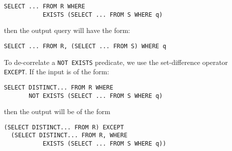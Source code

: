 {\footnotesize
\begin{verbatim}
SELECT ... FROM R WHERE 
           EXISTS (SELECT ... FROM S WHERE q)
\end{verbatim}
}

then the output query will have the form:

{\footnotesize
\begin{verbatim}
SELECT ... FROM R, (SELECT ... FROM S) WHERE q
\end{verbatim}
}

To de-correlate a \texttt{NOT EXISTS} predicate, we use the set-difference operator \texttt{EXCEPT}.  If the input is of the form:
{\footnotesize
\begin{verbatim}
SELECT DISTINCT... FROM R WHERE 
       NOT EXISTS (SELECT ... FROM S WHERE q)
\end{verbatim}
}
then the output will be of the form
{\footnotesize
\begin{verbatim}
(SELECT DISTINCT... FROM R) EXCEPT 
  (SELECT DISTINCT... FROM R, WHERE 
           EXISTS (SELECT ... FROM S WHERE q))
\end{verbatim}
}





